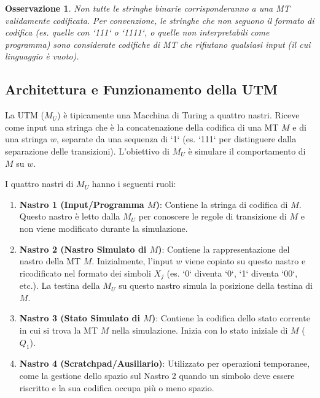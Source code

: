 \documentclass[a4paper]{article}
\newtheorem{remark}{Osservazione}
\begin{document}
\begin{remark}
Non tutte le stringhe binarie corrisponderanno a una MT validamente codificata. Per convenzione, le stringhe che non seguono il formato di codifica (es. quelle con `111` o `1111`, o quelle non interpretabili come programma) sono considerate codifiche di MT che rifiutano qualsiasi input (il cui linguaggio è vuoto).
\end{remark}

\subsection{Architettura e Funzionamento della UTM}

La UTM ($M_U$) è tipicamente una Macchina di Turing a quattro nastri. Riceve come input una stringa che è la concatenazione della codifica di una MT $M$ e di una stringa $w$, separate da una sequenza di `1` (es. `111` per distinguere dalla separazione delle transizioni). L'obiettivo di $M_U$ è simulare il comportamento di $M$ su $w$.

I quattro nastri di $M_U$ hanno i seguenti ruoli:
\begin{enumerate}
    \item \textbf{Nastro 1 (Input/Programma $M$)}: Contiene la stringa di codifica di $M$. Questo nastro è letto dalla $M_U$ per conoscere le regole di transizione di $M$ e non viene modificato durante la simulazione.
    \item \textbf{Nastro 2 (Nastro Simulato di $M$)}: Contiene la rappresentazione del nastro della MT $M$. Inizialmente, l'input $w$ viene copiato su questo nastro e ricodificato nel formato dei simboli $X_j$ (es. `0` diventa `0`, `1` diventa `00`, etc.). La testina della $M_U$ su questo nastro simula la posizione della testina di $M$.
    \item \textbf{Nastro 3 (Stato Simulato di $M$)}: Contiene la codifica dello stato corrente in cui si trova la MT $M$ nella simulazione. Inizia con lo stato iniziale di $M$ ($Q_1$).
    \item \textbf{Nastro 4 (Scratchpad/Ausiliario)}: Utilizzato per operazioni temporanee, come la gestione dello spazio sul Nastro 2 quando un simbolo deve essere riscritto e la sua codifica occupa più o meno spazio.
\end{enumerate}
\end{document}
